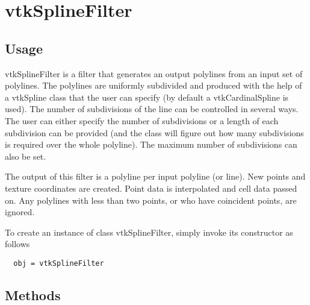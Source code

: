 \section{vtkSplineFilter}

\subsection{Usage}

 vtkSplineFilter is a filter that generates an output polylines from an
 input set of polylines. The polylines are uniformly subdivided and produced
 with the help of a vtkSpline class that the user can specify (by default a
 vtkCardinalSpline is used). The number of subdivisions of the line can be
 controlled in several ways. The user can either specify the number of
 subdivisions or a length of each subdivision can be provided (and the
 class will figure out how many subdivisions is required over the whole
 polyline). The maximum number of subdivisions can also be set.

 The output of this filter is a polyline per input polyline (or line). New
 points and texture coordinates are created. Point data is interpolated and
 cell data passed on. Any polylines with less than two points, or who have
 coincident points, are ignored.

To create an instance of class vtkSplineFilter, simply
invoke its constructor as follows
\begin{verbatim}
  obj = vtkSplineFilter
\end{verbatim}
\subsection{Methods}


